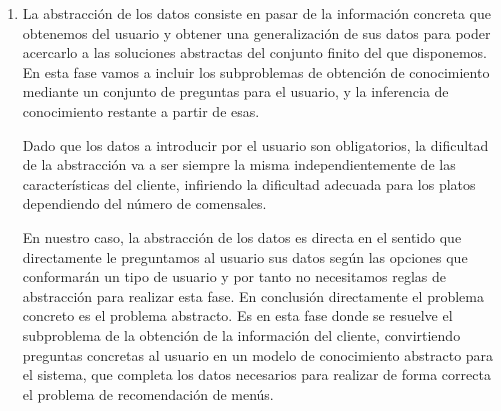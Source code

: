 \documentclass{article}
\begin{document}
\begin {enumerate}
    \item La abstracción de los datos consiste en pasar de la información concreta que obtenemos del usuario y obtener una generalización de sus datos para poder acercarlo a las soluciones abstractas del conjunto finito del que disponemos. En esta fase vamos a incluir los subproblemas de obtención de conocimiento mediante un conjunto de preguntas para el usuario, y la inferencia de conocimiento restante a partir de esas.
    \par
    Dado que los datos a introducir por el usuario son obligatorios, la dificultad de la abstracción va a ser siempre la misma independientemente de las características del cliente, infiriendo la dificultad adecuada para los platos dependiendo del número de comensales.
    \par
    En nuestro caso, la abstracción de los datos es directa en el sentido que directamente le preguntamos al usuario sus datos según las opciones que conformarán un tipo de usuario y por tanto no necesitamos reglas de abstracción para realizar esta fase. En conclusión directamente el problema concreto es el problema abstracto. Es en esta fase donde se resuelve el subproblema de la obtención de la información del cliente, convirtiendo preguntas concretas al usuario en un modelo de conocimiento abstracto para el sistema, que completa los datos necesarios para realizar de forma correcta el problema de recomendación de menús.


\end{enumerate}
\end{document}
